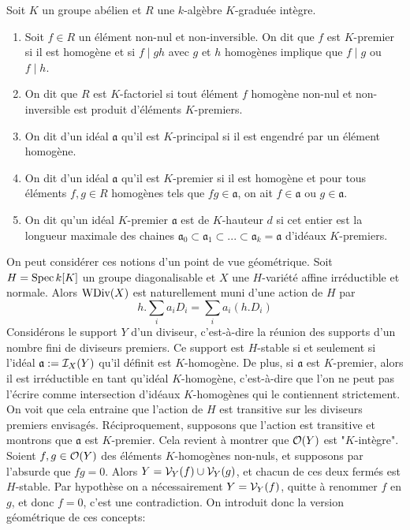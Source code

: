 \begin{defn}
Soit $K$ un groupe abélien et $R$ une $k$-algèbre $K$-graduée intègre.
\begin{enumerate}
\item Soit $f\in R$ un élément non-nul et non-inversible. On dit que $f$ est $K$-premier si il est homogène et si $f\mid gh$ avec $g$ et $h$ homogènes implique que $f\mid g$ ou $f\mid h$.
\item On dit que $R$ est $K$-factoriel si tout élément $f$ homogène non-nul et non-inversible est produit d'éléments $K$-premiers.
\item On dit d'un idéal $\mathfrak{a}$ qu'il est $K$-principal si il est engendré par un élément homogène.
\item On dit d'un idéal $\mathfrak{a}$ qu'il est $K$-premier si il est homogène et pour tous éléments $f,g\in R$ homogènes tels que $fg\in\mathfrak{a}$, on ait $f\in\mathfrak{a}$ ou $g\in\mathfrak{a}$.
\item On dit qu'un idéal $K$-premier $\mathfrak{a}$ est de $K$-hauteur $d$ si cet entier est la longueur maximale des chaines $\mathfrak{a}_0\subset \mathfrak{a}_1\subset ...\subset \mathfrak{a}_k=\mathfrak{a}$ d'idéaux $K$-premiers.
\end{enumerate}
\end{defn}

On peut considérer ces notions d'un point de vue géométrique. Soit $H=\operatorname{Spec} k[K]$ un groupe diagonalisable et $X$ une $H$-variété affine irréductible et normale. Alors $\operatorname{WDiv}(X)$ est naturellement muni d'une action de $H$ par 
$$h.\sum_i a_iD_i=\sum_i a_i(h.D_i)$$
Considérons le support $Y$ d'un diviseur, c'est-à-dire la réunion des supports d'un nombre fini de diviseurs premiers. Ce support est $H$-stable si et seulement si l'idéal $\mathfrak{a}:=\mathcal{I}_X(Y)$ qu'il définit est $K$-homogène. De plus, si $\mathfrak{a}$ est $K$-premier, alors il est irréductible en tant qu'idéal $K$-homogène, c'est-à-dire que l'on ne peut pas l'écrire comme intersection d'idéaux $K$-homogènes qui le contiennent strictement. On voit que cela entraine que l'action de $H$ est transitive sur les diviseurs premiers envisagés. Réciproquement, supposons que l'action est transitive et montrons que $\mathfrak{a}$ est $K$-premier. Cela revient à montrer que $\mathcal{O}(Y)$ est "$K$-intègre". Soient $f,g\in \mathcal{O}(Y)$ des éléments $K$-homogènes non-nuls, et supposons par l'absurde que $fg=0$. Alors $Y=\mathcal{V}_Y(f)\cup\mathcal{V}_Y(g)$, et chacun de ces deux fermés est $H$-stable. Par hypothèse on a nécessairement $Y=\mathcal{V}_Y(f)$, quitte à renommer $f$ en $g$, et donc $f=0$, c'est une contradiction. On introduit donc la version géométrique de ces concepts:

